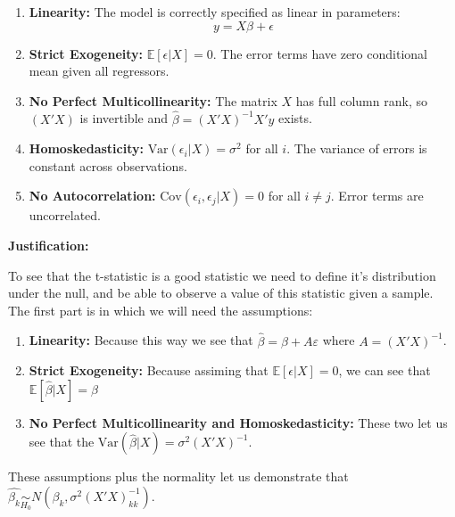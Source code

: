 \documentclass[12pt,a4paper]{article}
\begin{document}
\begin{enumerate}[label=(\alph*)]
      \begin{enumerate}
      \item \textbf{Linearity:} The model is correctly specified as linear in parameters:
      $$y = X\beta + \epsilon$$

      \item \textbf{Strict Exogeneity:} $\mathbb{E}[\epsilon | X] = 0$. The error terms have zero conditional mean given all regressors.

      \item \textbf{No Perfect Multicollinearity:} The matrix $X$ has full column rank, so $(X'X)$ is invertible and $\hat{\beta} = (X'X)^{-1}X'y$ exists.

      \item \textbf{Homoskedasticity:} $\text{Var}(\epsilon_i | X) = \sigma^2$ for all $i$. The variance of errors is constant across observations.

      \item \textbf{No Autocorrelation:} $\text{Cov}(\epsilon_i, \epsilon_j | X) = 0$ for all $i \neq j$. Error terms are uncorrelated.
      \end{enumerate}

    \textbf{Justification:} 

    To see that the t-statistic is a good statistic we need to define it's distribution under the null, and be able to observe a value of this statistic given a sample. The first part is in which we will need the assumptions:
    
    \begin{enumerate}
      \item \textbf{Linearity:} Because this way we see that $\hat{\beta}= \beta + A\varepsilon$ where $A = (X'X)^{-1}$.

      \item \textbf{Strict Exogeneity:} Because assiming that $\mathbb{E}[\epsilon | X] = 0$, we can see that $\mathbb{E}[\hat{\beta} | X] = \beta$

      \item \textbf{No Perfect Multicollinearity and Homoskedasticity:} These two let us see that the $\text{Var}(\hat{\beta }| X) = \sigma^2(X'X)^{-1}$.
      \end{enumerate}

      These assumptions plus the normality let us demonstrate that $\hat{\beta_k} \underset{H_0}{\sim}
 N(\beta_k, \sigma^2(X'X)^{-1}_{kk})$.


\end{enumerate}
\end{document}
